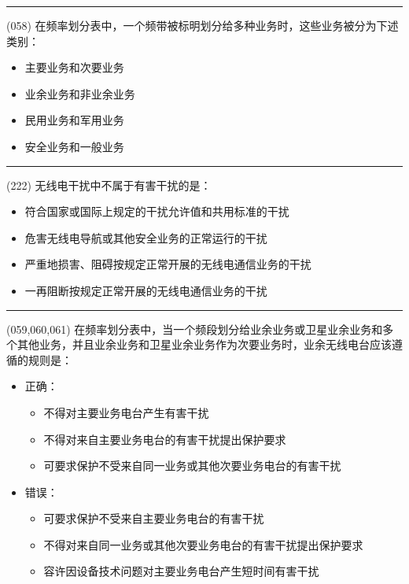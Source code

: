 \documentclass[twocolumn,hyperref,UTF8]{ctexart}  %
\begin{document}
\noindent\rule{0.5\textwidth}{1pt}
\heiti (058) 在频率划分表中，一个频带被标明{\color{cyan}划分}给多种业务时，这些业务被分为下述类别： \songti {\color{gray} [LK0140] }
\begin{itemize}
	\item  主要业务和次要业务
	\item  业余业务和非业余业务
	\item  民用业务和军用业务
	\item  安全业务和一般业务
\end{itemize}


\noindent\rule{0.5\textwidth}{1pt}
\heiti (222) 无线电干扰中不属于有害干扰的是： \songti {\color{gray} [LK0138] }
\begin{itemize}
	\item  符合国家或国际上规定的干扰允许值和共用标准的干扰
	\item  危害无线电导航或其他安全业务的正常运行的干扰
	\item  严重地损害、阻碍按规定正常开展的无线电通信业务的干扰
	\item  一再阻断按规定正常开展的无线电通信业务的干扰
\end{itemize}


\noindent\rule{0.5\textwidth}{1pt}
\heiti (059,060,061) 在频率划分表中，当一个频段{\color{cyan}划分}给业余业务或卫星业余业务和多个其他业务，并且业余业务和卫星业余业务{\color{cyan}作为次要业务}时，业余无线电台应该遵循的规则是： \songti {\color{gray} [LK0141,LK0142,LK0143] }
\begin{itemize}
	\item  正确：
		\begin{itemize}
			\item  不得对主要业务电台产生有害干扰
			\item  不得对来自主要业务电台的有害干扰提出保护要求
			\item  可要求保护不受来自同一业务或其他次要业务电台的有害干扰
		\end{itemize}

	\item  错误：
		\begin{itemize}
			\item  可要求保护不受来自主要业务电台的有害干扰
			\item  不得对来自同一业务或其他次要业务电台的有害干扰提出保护要求
			\item  容许因设备技术问题对主要业务电台产生短时间有害干扰
		\end{itemize}
\end{itemize}
\end{document}
